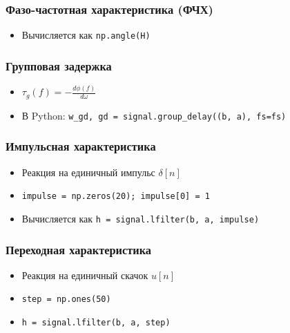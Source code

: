 \documentclass[12pt,a4paper,openany]{book}
\providecommand{\tightlist}{\setlength{\itemsep}{0pt}\setlength{\parskip}{0pt}}
\begin{document}
\subsubsection*{Фазо-частотная характеристика (ФЧХ)}

\begin{itemize}
\tightlist
\item
  Вычисляется как \texttt{np.\allowbreak{}angle(\allowbreak{}H)}
\end{itemize}

\subsubsection*{Групповая задержка}

\begin{itemize}
\tightlist
\item
  \(\tau_g(f) = -\frac{d\phi(f)}{d\omega}\)
\item
  В Python: \texttt{w\_\allowbreak{}gd,\allowbreak{}\ gd\ =\allowbreak{}\ signal.\allowbreak{}group\_\allowbreak{}delay(\allowbreak{}(\allowbreak{}b,\allowbreak{}\ a),\allowbreak{}\ fs=\allowbreak{}fs)}
\end{itemize}

\subsubsection*{Импульсная характеристика}

\begin{itemize}
\tightlist
\item
  Реакция на единичный импульс \(\delta[n]\)
\item
  \texttt{impulse\ =\allowbreak{}\ np.\allowbreak{}zeros(\allowbreak{}20);\ impulse{[}0{]}\ =\allowbreak{}\ 1}
\item
  Вычисляется как \texttt{h\ =\allowbreak{}\ signal.\allowbreak{}lfilter(\allowbreak{}b,\allowbreak{}\ a,\allowbreak{}\ impulse)}
\end{itemize}

\subsubsection*{Переходная характеристика}

\begin{itemize}
\tightlist
\item
  Реакция на единичный скачок \(u[n]\)
\item
  \texttt{step\ =\allowbreak{}\ np.\allowbreak{}ones(\allowbreak{}50)}
\item
  \texttt{h\ =\allowbreak{}\ signal.\allowbreak{}lfilter(\allowbreak{}b,\allowbreak{}\ a,\allowbreak{}\ step)}
\end{itemize}
\end{document}
